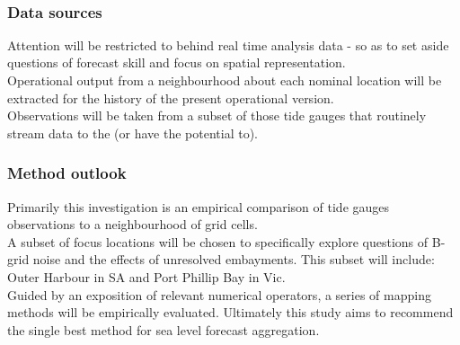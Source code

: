 \begin{figure}[!h]
	\centering
	\\

	\label{fig:cells_coast}
\end{figure}

\subsubsection{Data sources}
Attention will be restricted to \BL{} behind real time analysis data - so as to set aside questions of forecast skill and focus on spatial representation.\\
Operational output from a neighbourhood about each nominal location will be extracted for the history of the present operational version. \\
Observations will be taken from a subset of those tide gauges that routinely stream data to the \BOM{} (or have the potential to).



\subsubsection{Method outlook}
Primarily this investigation is an empirical comparison of tide gauges observations to a neighbourhood of grid cells.\\
A subset of focus locations will be chosen to specifically explore questions of B-grid noise and the effects of unresolved embayments.   This subset will include: Outer Harbour in SA and Port Phillip Bay in Vic.\\  
Guided by an exposition of relevant numerical operators, a series of mapping methods will be empirically evaluated.   Ultimately this study aims to recommend the single best method for sea level forecast aggregation.




